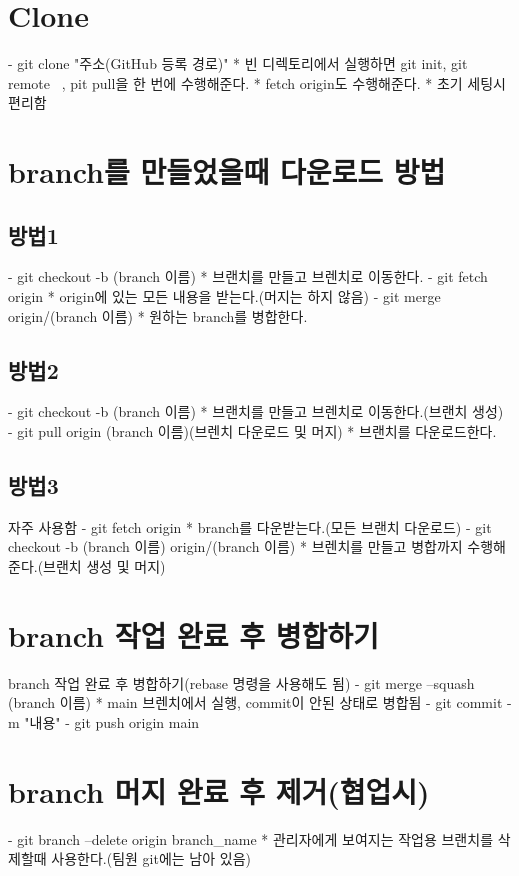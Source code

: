 \documentclass[12pt,a4paper,twoside, footnote]{oblivoir}
\begin{document}
\section[Clone]{Clone}
  - git clone "주소(GitHub 등록 경로)"
    * 빈 디렉토리에서 실행하면 git init, git remote ~, pit pull을 한 번에 수행해준다.
    * fetch origin도 수행해준다.
    * 초기 세팅시 편리함

\section[branch를 만들었을때 다운로드 방법]{branch를 만들었을때 다운로드 방법}
\subsection{방법1}
  - git checkout -b (branch 이름)
    * 브랜치를 만들고 브렌치로 이동한다.
  - git fetch origin
    * origin에 있는 모든 내용을 받는다.(머지는 하지 않음)
  - git merge origin/(branch 이름)
    * 원하는 branch를 병합한다.
\subsection{방법2}
  - git checkout -b (branch 이름)
    * 브랜치를 만들고 브렌치로 이동한다.(브랜치 생성)
  - git pull origin (branch 이름)(브렌치 다운로드 및 머지)
    * 브랜치를 다운로드한다.
\subsection{방법3}
  자주 사용함
  - git fetch origin
    * branch를 다운받는다.(모든 브랜치 다운로드)
  - git checkout -b (branch 이름) origin/(branch 이름)
    * 브렌치를 만들고 병합까지 수행해준다.(브랜치 생성 및 머지)

\section[branch 작업 완료 후 병합하기]{branch 작업 완료 후 병합하기}
  branch 작업 완료 후 병합하기(rebase 명령을 사용해도 됨)
  - git merge --squash (branch 이름)
    * main 브렌치에서 실행, commit이 안된 상태로 병합됨
  - git commit -m "내용"
  - git push origin main

\section[branch 머지 완료 후 제거(협업시)]{branch 머지 완료 후 제거(협업시)}
  - git branch --delete origin branch_name
    * 관리자에게 보여지는 작업용 브랜치를 삭제할때 사용한다.(팀원 git에는 남아 있음)
\end{document}
